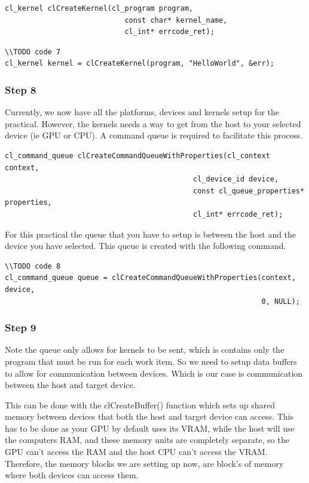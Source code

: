 \begin{lstlisting}
cl_kernel clCreateKernel(cl_program program,
	                        const char* kernel_name,
	                        cl_int* errcode_ret);
\end{lstlisting}

\begin{lstlisting}
\\TODO code 7
cl_kernel kernel = clCreateKernel(program, "HelloWorld", &err);
\end{lstlisting}

\subsubsection{Step 8}
Currently, we now have all the platforms, devices and kernels setup for the practical. However, the kernels needs a way to get from the host to your selected device (ie GPU or CPU). A command queue is required to facilitate this process.

\begin{lstlisting}
cl_command_queue clCreateCommandQueueWithProperties(cl_context context,
                                            cl_device_id device,
                                            const cl_queue_properties* properties,
                                            cl_int* errcode_ret);
\end{lstlisting}

For this practical the queue that you have to setup is between the host and the device you have selected. This queue is created with the following command.

\begin{lstlisting}
\\TODO code 8
cl_command_queue queue = clCreateCommandQueueWithProperties(context, device, 
                                                            0, NULL);
\end{lstlisting}

\subsubsection{Step 9}
Note the queue only allows for kernels to be sent, which is contains only the program that must be run for each work item. So we need to setup data buffers to allow for communication between devices. Which is our case is communication between the host and target device. 

This can be done with the clCreateBuffer() function which sets up shared memory between devices that both the host and target device can access. This has to be done as your GPU by default uses its VRAM, while the host will use the computers RAM, and these memory units are completely separate, so the GPU can't access the RAM and the host CPU can't access the VRAM. Therefore, the memory blocks we are setting up now, are block's of memory where both devices can access them.

